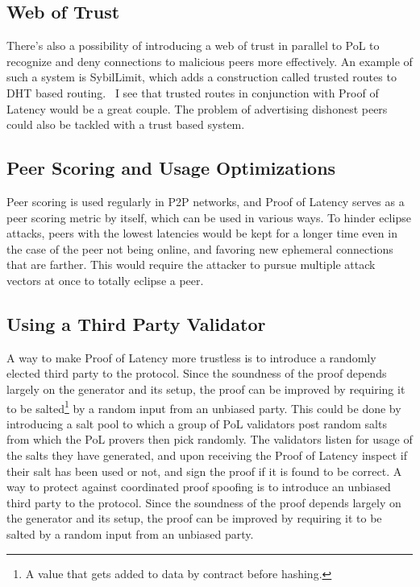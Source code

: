 \subsection{Web of Trust}
There's also a possibility of introducing a web of trust in parallel to PoL to recognize and deny connections to malicious peers more effectively. An example of such a system is SybilLimit, which adds a construction called trusted routes to DHT based routing.~\cite{Yu2008-xl} I see that trusted routes in conjunction with Proof of Latency would be a great couple. The problem of advertising dishonest peers could also be tackled with a trust based system.

\subsection{Peer Scoring and Usage Optimizations}
Peer scoring is used regularly in P2P networks, and Proof of Latency serves as a peer scoring metric by itself, which can be used in various ways. To hinder eclipse attacks, peers with the lowest latencies would be kept for a longer time even in the case of the peer not being online, and favoring new ephemeral connections that are farther. This would require the attacker to pursue multiple attack vectors at once to totally eclipse a peer.


\subsection{Using a Third Party Validator}
A way to make Proof of Latency more trustless is to introduce a randomly elected third party to the protocol. Since the soundness of the proof depends largely on the generator and its setup, the proof can be improved by requiring it to be salted\footnote{A value that gets added to data by contract before hashing.} by a random input from an unbiased party. This could be done by introducing a salt pool to which a group of PoL validators post random salts from which the PoL provers then pick randomly. The validators listen for usage of the salts they have generated, and upon receiving the Proof of Latency inspect if their salt has been used or not, and sign the proof if it is found to be correct. A way to protect against coordinated proof spoofing is to introduce an unbiased third party to the protocol. Since the soundness of the proof depends largely on the generator and its setup, the proof can be improved by requiring it to be salted by a random input from an unbiased party.

